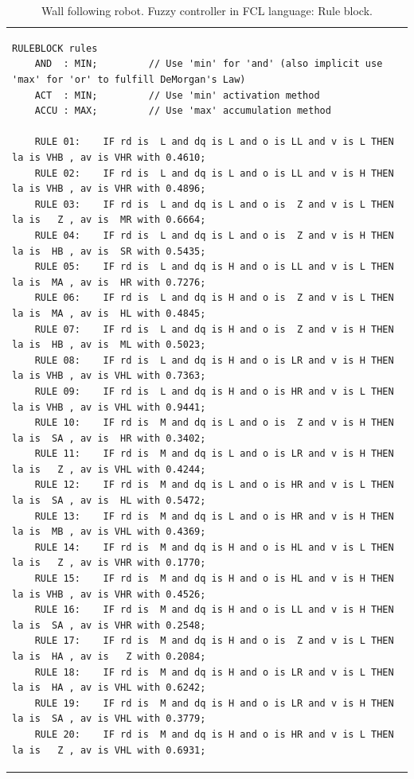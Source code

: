 \documentclass[conference]{IEEEtran}
\begin{document}
\begin{table}[!t]
\renewcommand{\arraystretch}{1.3}
\caption{Wall following robot. Fuzzy controller in FCL language: Rule block.}
\label{t:robotRules}
\centering
\begin{tabular}{|l|}
\hline
\begin{lstlisting}
RULEBLOCK rules
	AND  : MIN;			// Use 'min' for 'and' (also implicit use 'max' for 'or' to fulfill DeMorgan's Law)
	ACT  : MIN;			// Use 'min' activation method
	ACCU : MAX;			// Use 'max' accumulation method

    RULE 01:    IF rd is  L and dq is L and o is LL and v is L THEN la is VHB , av is VHR with 0.4610;
    RULE 02:    IF rd is  L and dq is L and o is LL and v is H THEN la is VHB , av is VHR with 0.4896;
    RULE 03:    IF rd is  L and dq is L and o is  Z and v is L THEN la is   Z , av is  MR with 0.6664;
    RULE 04:    IF rd is  L and dq is L and o is  Z and v is H THEN la is  HB , av is  SR with 0.5435;
    RULE 05:    IF rd is  L and dq is H and o is LL and v is L THEN la is  MA , av is  HR with 0.7276;
    RULE 06:    IF rd is  L and dq is H and o is  Z and v is L THEN la is  MA , av is  HL with 0.4845;
    RULE 07:    IF rd is  L and dq is H and o is  Z and v is H THEN la is  HB , av is  ML with 0.5023;
    RULE 08:    IF rd is  L and dq is H and o is LR and v is H THEN la is VHB , av is VHL with 0.7363;
    RULE 09:    IF rd is  L and dq is H and o is HR and v is L THEN la is VHB , av is VHL with 0.9441;
    RULE 10:    IF rd is  M and dq is L and o is  Z and v is H THEN la is  SA , av is  HR with 0.3402;
    RULE 11:    IF rd is  M and dq is L and o is LR and v is H THEN la is   Z , av is VHL with 0.4244;
    RULE 12:    IF rd is  M and dq is L and o is HR and v is L THEN la is  SA , av is  HL with 0.5472;
    RULE 13:    IF rd is  M and dq is L and o is HR and v is H THEN la is  MB , av is VHL with 0.4369;
    RULE 14:    IF rd is  M and dq is H and o is HL and v is L THEN la is   Z , av is VHR with 0.1770;
    RULE 15:    IF rd is  M and dq is H and o is HL and v is H THEN la is VHB , av is VHR with 0.4526;
    RULE 16:    IF rd is  M and dq is H and o is LL and v is H THEN la is  SA , av is VHR with 0.2548;
    RULE 17:    IF rd is  M and dq is H and o is  Z and v is L THEN la is  HA , av is   Z with 0.2084;
    RULE 18:    IF rd is  M and dq is H and o is LR and v is L THEN la is  HA , av is VHL with 0.6242;
    RULE 19:    IF rd is  M and dq is H and o is LR and v is H THEN la is  SA , av is VHL with 0.3779;
    RULE 20:    IF rd is  M and dq is H and o is HR and v is L THEN la is   Z , av is VHL with 0.6931;

\end{lstlisting}
\end{tabular}
\end{table}
\end{document}
